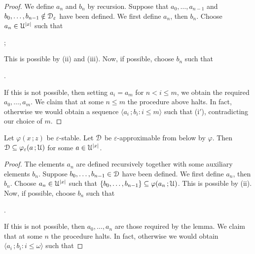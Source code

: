 \documentclass{amsproc}
\begin{document}
{\begin{proof}

  We define $a_n$ and $b_n$ by recursion.
  Suppose that $a_0,\dots,a_{n-1}$ and $b_0,\dots,b_{n-1}\notin{\EuScript D}_\varepsilon$ have been defined.
  We first define $a_n$, then $b_n$. 
  Choose $a_n\in{\EuScript U}^{|x|}$ such that 
  
  ;
  


  This is possible by (ii) and (iii).
  Now, if possible, choose $b_n$ such that

  .

  If this is not possible, then setting $a_i=a_m$ for $n<i\le m$, we obtain the required $a_0,\dots,a_m$.
  We claim that at some $n\le m$ the procedure above halts.
  In fact, otherwise we would obtain a sequence $\langle a_i\,;b_i : i\le m\rangle$ such that (i$'$), contradicting our choice of $m$.
\end{proof}


\begin{lemma}\label{lem_def_frombelow}
  Let $\varphi(x\,;z)$ be $\varepsilon$-stable.
  Let ${\EuScript D}$ be $\varepsilon$-approximable from below by $\varphi$.
  Then ${\EuScript D}\subseteq\varphi_\varepsilon(a\,;{\EuScript U})$ for some $a\in{\EuScript U}^{|x|}$. 
\end{lemma}

\begin{proof}
  The elements $a_n$ are defined recursively together with some auxiliary elements $b_n$.
  Suppose $b_0,\dots,b_{n-1}\in{\EuScript D}$ have been defined.
  We first define $a_n$, then $b_n$.
  Choose $a_n\in{\EuScript U}^{|x|}$ such that $\{b_0,\dots,b_{n-1}\}\subseteq\varphi(a_n\,;{\EuScript U})$.
  This is possible by (ii).
  Now, if possible, choose $b_n$ such that

  .

  If this is not possible, then $a_0,\dots,a_n$ are those required by the lemma.
  We claim that at some $n$ the procedure halts.
  In fact, otherwise we would obtain $\langle a_i\,;b_i : i\le \omega\rangle$ such that 
\end{proof}

}
\end{document}

